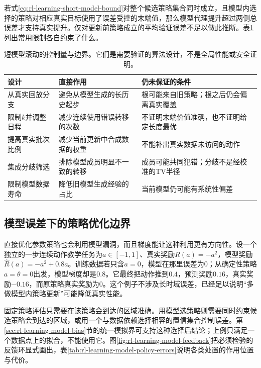 若式\eqref{eq:rl-learning-short-model-bound}对整个候选策略集合同时成立，且模型内选择的策略对相应真实目标使用了误差受控的末端值，那么模型代理提升超过两侧总误差才支持真实提升。仅对更新前策略成立的平均验证误差不足以做此推断。表\ref{tab:rl-learning-rollout-controls}列出常用限制各自约束了什么。

\begin{table}[t]
  \centering
  \small
  \begin{tabularx}{\linewidth}{>{\raggedright\arraybackslash}p{25mm} >{\raggedright\arraybackslash}X >{\raggedright\arraybackslash}X}
    \toprule
    设计 & 直接作用 & 仍未保证的条件 \\
    \midrule
    从真实回放分支 & 避免从模型生成的长历史起步 & 根可能来自旧策略；根之后仍会偏离真实覆盖 \\
    限制$k$并调整日程 & 减少连续使用错误转移的次数 & 不证明末端价值准确，也不证明给定长度最优 \\
    提高真实批次比例 & 减少当前更新中合成数据的权重 & 不能补出真实数据未访问的动作 \\
    集成分歧筛选 & 排除模型成员明显不一致的转移 & 成员可能共同犯错；分歧不是经校准的TV半径 \\
    限制模型数据寿命 & 降低旧模型生成经验的占比 & 当前模型仍可能有系统性偏差 \\
    \bottomrule
  \end{tabularx}
  \caption{短模型滚动的控制量与边界。它们是需要验证的算法设计，不是全局性能或安全证明。}
  \label{tab:rl-learning-rollout-controls}
\end{table}

\subsection{模型误差下的策略优化边界}
\label{sec:rl-learning-model-policy-boundary}

直接优化参数策略也会利用模型漏洞，而且梯度能让这种利用更有方向性。设一个独立的一步连续动作教学任务为$a\in[-1,1]$、真实奖励$R(a)=-a^2$，模型奖励
$\widehat R(a)=-a^2+0.8a$。训练数据若只含$a=0$，模型在那里误差为0；从确定性策略$a=\theta=0$出发，模型梯度却是$0.8$。它最终把动作推到$0.4$，预测奖励$0.16$，真实奖励$-0.16$，而原策略真实奖励为0。这个例子不涉及长时域误差，已经足以说明“多做模型内策略更新”可能降低真实性能。

固定策略评估只需要在该策略会到达的区域准确。用模型选策略则需要同时约束候选策略会到达的区域，或用一个与数据依赖选择相容的置信集合控制误差。第\ref{sec:rl-learning-model-bias}节的统一模拟界可支持这种选择后结论；上例只满足一个数据点上的拟合，不能使用它。图\ref{fig:rl-learning-model-feedback}把必须检验的反馈环显式画出，表\ref{tab:rl-learning-model-policy-errors}说明各类处置的作用位置与代价。


